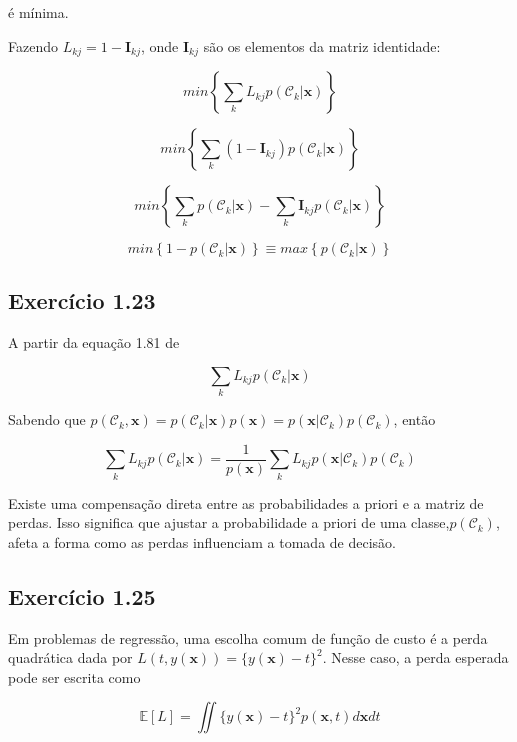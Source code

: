 \documentclass{article}
\begin{document}
 é mínima.
 
 Fazendo $L_{kj} = 1 - \mathbf{I}_{kj}$, onde $\mathbf{I}_{kj}$ são os elementos da matriz identidade:
 
  \[
   min\left\{\sum_{k}L_{kj}p(\mathcal{C}_{k}| \mathbf{x}) \right\}
  \]
  
  \[
  min\left\{\sum_{k} (1 - \mathbf{I}_{kj}) p(\mathcal{C}_{k}| \mathbf{x}) \right\}
  \]
  
   \[
  min\left\{\sum_{k}p(\mathcal{C}_{k}| \mathbf{x}) - \sum_{k}\mathbf{I}_{kj}p(\mathcal{C}_{k}| \mathbf{x}) \right\}
  \]
  
  \[
  min\left\{1 - p(\mathcal{C}_{k}| \mathbf{x}) \right\} \equiv max\left\{ p(\mathcal{C}_{k}| \mathbf{x})\right\}
  \]
  
  

\subsection{ Exerc\'icio 1.23}
 
 A partir da equação 1.81 de \cite{Bishop2006}

  \begin{equation}
	\sum_{k}L_{kj}p(\mathcal{C}_{k}| \mathbf{x})                      
  \end{equation}
  
 Sabendo que $p(\mathcal{C}_{k}, \mathbf{x})=p(\mathcal{C}_{k}| \mathbf{x})p(\mathbf{x})=p(\mathbf{x}|\mathcal{C}_{k})p(\mathcal{C}_{k}) $, então
 
 \[
   	\sum_{k}L_{kj}p(\mathcal{C}_{k}| \mathbf{x})  = \frac{1}{p(\mathbf{x})} 	\sum_{k}L_{kj}p(\mathbf{x}|\mathcal{C}_{k})p(\mathcal{C}_{k})
 \]
 
 Existe uma compensação direta entre as probabilidades a priori e a matriz de perdas. Isso significa que ajustar a probabilidade a priori de uma classe,$p(\mathcal{C}_{k})$, afeta a forma como as perdas influenciam a tomada de decisão.

\subsection{ Exerc\'icio 1.25}

  Em problemas de regressão, uma escolha comum de função de custo é a perda quadrática dada por $L(t,y(\mathbf{x}))=\{y(\mathbf{x}) - t\}^{2}$. Nesse caso, a perda esperada pode ser escrita como
  

  \begin{equation}
  	\mathbb{E}[L]=\iint\{y(\mathbf{x})-t\}^{2}p(\mathbf{x},t)d\mathbf{x}dt    
  \end{equation}
\end{document}
